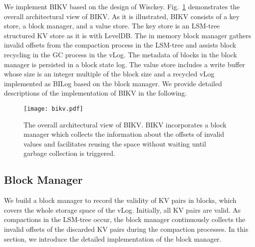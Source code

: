 \documentclass[sigconf]{acmart}
\begin{document}
We implement BIKV based on  the design of Wisckey. Fig.~\ref{fig:bikv} demonstrates the overall architectural view of BIKV.  As it is illustrated, BIKV consists of a key store, a block manager, and a value store. The key store is an LSM-tree structured KV store as it is with LevelDB. The in memory block manager gathers invalid offsets from the compaction process in the LSM-tree and assists block recycling in the GC process in the vLog. The metadata of blocks in the block manager is persisted in a block state log. The value store includes a write buffer whose size is an integer multiple of the block size and a recycled vLog implemented as BILog based on the block manager. We provide detailed descriptions of the implementation of BIKV in the following.


\begin{figure}[!t]
	\setlength{\abovecaptionskip}{0.cm}	
	\setlength{\belowcaptionskip}{-0.cm}
	\centerline{\texttt{[image: bikv.pdf]}}
	\caption{The overall architectural view of BIKV. BIKV incorporates a block manager which collects the information about the offsets of invalid values and facilitates reusing the space without waiting until garbage collection is triggered. }
	\label{fig:bikv}
\end{figure}

\subsection{Block Manager} \label{ss1}
We build a block manager to record the validity of KV pairs in blocks, which covers the whole storage space of the vLog. Initially, all KV pairs are valid. As compactions in the LSM-tree occur, the block manager continuously collects the invalid offsets of the discarded KV pairs during the compaction processes. In this section, we introduce the detailed implementation of the block manager.
\end{document}
